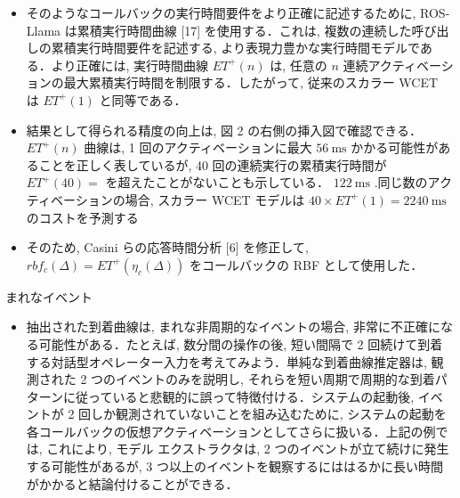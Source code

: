 \begin{frame}{}
    \begin{itemize}
        \item そのようなコールバックの実行時間要件をより正確に記述するために, ROS-Llama は累積実行時間曲線 [17] を使用する．これは, 複数の連続した呼び出しの累積実行時間要件を記述する, より表現力豊かな実行時間モデルである．より正確には, 実行時間曲線 $E T^{+}(n)$ は, 任意の $n$ 連続アクティベーションの最大累積実行時間を制限する．したがって, 従来のスカラー WCET は $E T^{+}(1)$ と同等である．
    \end{itemize}
\end{frame}

\begin{frame}{}
    \begin{itemize}
        \item 結果として得られる精度の向上は, 図 2 の右側の挿入図で確認できる． $E T^{+}(n)$ 曲線は, 1 回のアクティベーションに最大 $56 \mathrm{~ms}$ かかる可能性があることを正しく表しているが, 40 回の連続実行の累積実行時間が $E T^{+}(40)=$ を超えたことがないことも示している． $122 \mathrm{~ms}$ .同じ数のアクティベーションの場合, スカラー WCET モデルは $40 \times E T^{+}(1)=2240 \mathrm{~ms}$ のコストを予測する
    \end{itemize}
\end{frame}

\begin{frame}{}
    \begin{itemize}
        \item そのため, Casini らの応答時間分析 [6] を修正して, $r b f_{c}(\Delta)=E T^{+}\left(\eta_{c}(\Delta)\right)$ をコールバックの RBF として使用した．
    \end{itemize}
\end{frame}

\begin{frame}{まれなイベント}
    \begin{itemize}
        \item 抽出された到着曲線は, まれな非周期的なイベントの場合, 非常に不正確になる可能性がある．たとえば, 数分間の操作の後, 短い間隔で 2 回続けて到着する対話型オペレーター入力を考えてみよう．単純な到着曲線推定器は, 観測された 2 つのイベントのみを説明し, それらを短い周期で周期的な到着パターンに従っていると悲観的に誤って特徴付ける．システムの起動後, イベントが 2 回しか観測されていないことを組み込むために, システムの起動を各コールバックの仮想アクティベーションとしてさらに扱いる．上記の例では, これにより, モデル エクストラクタは, 2 つのイベントが立て続けに発生する可能性があるが, 3 つ以上のイベントを観察するにははるかに長い時間がかかると結論付けることができる．
    \end{itemize}
\end{frame}
